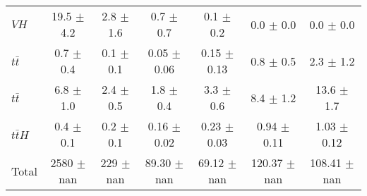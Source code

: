 \begin{tabular}{|l|c|c|c|c|c|c|}
  $VH$   & 19.5 $\pm$ 4.2 & 2.8 $\pm$ 1.6 & 0.7 $\pm$ 0.7 & 0.1 $\pm$ 0.2 & 0.0 $\pm$ 0.0 & 0.0 $\pm$ 0.0 \\ 
  $t\bar{t}$   & 0.7 $\pm$ 0.4 & 0.1 $\pm$ 0.1 & 0.05 $\pm$ 0.06 & 0.15 $\pm$ 0.13 & 0.8 $\pm$ 0.5 & 2.3 $\pm$ 1.2 \\ 
  $t\bar{t}$   & 6.8 $\pm$ 1.0 & 2.4 $\pm$ 0.5 & 1.8 $\pm$ 0.4 & 3.3 $\pm$ 0.6 & 8.4 $\pm$ 1.2 & 13.6 $\pm$ 1.7 \\ 
  $t\bar{t}H$   & 0.4 $\pm$ 0.1 & 0.2 $\pm$ 0.1 & 0.16 $\pm$ 0.02 & 0.23 $\pm$ 0.03 & 0.94 $\pm$ 0.11 & 1.03 $\pm$ 0.12 \\ 
\hline 
  Total  & 2580 $\pm$ nan & 229 $\pm$ nan & 89.30 $\pm$ nan & 69.12 $\pm$ nan & 120.37 $\pm$ nan & 108.41 $\pm$ nan \\ 
\hline 
\end{tabular} 
